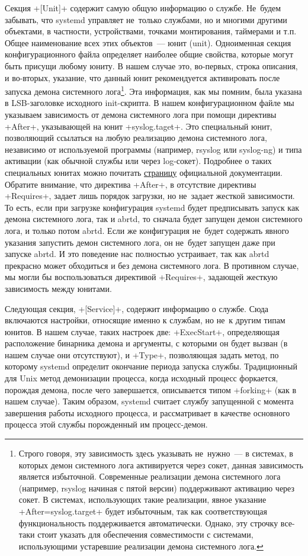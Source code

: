 \documentclass[10pt,oneside,a4paper]{article}
\begin{document}
Секция +[Unit]+ содержит самую общую информацию о службе. Не~будем
забывать, что systemd управляет не~только службами, но и многими другими
объектами, в частности, устройствами, точками монтирования, таймерами и т.п.
Общее наименование всех этих объектов~--- юнит (unit). Одноименная секция
конфигурационного файла определяет наиболее общие свойства, которые могут
быть присущи любому юниту. В нашем случае это, во-первых, строка описания, и
во-вторых, указание, что данный юнит рекомендуется активировать после запуска
демона системного лога\footnote{Строго говоря, эту зависимость здесь
указывать не~нужно~--- в системах, в которых демон системного лога активируется
через сокет, данная зависимость является избыточной. Современные реализации
демона системного лога (например, rsyslog начиная с пятой версии)
поддерживают активацию через сокет. В системах, использующих такие
реализации, явное указание +After=syslog.target+ будет избыточным, так
как соответствующая функциональность поддерживается автоматически. Однако,
эту строчку все-таки стоит указать для обеспечения совместимости с системами,
использующими устаревшие реализации демона системного лога.}. Эта информация,
как мы помним, была указана в LSB-заголовке исходного init-скрипта. В нашем
конфигурационном файле мы указываем зависимость от демона системного лога при
помощи директивы +After+, указывающей на юнит +syslog.taget+. Это
специальный юнит, позволяющий ссылаться на любую реализацию демона системного
лога, независимо от используемой программы (например, rsyslog или syslog-ng)
и типа активации (как обычной службы или через log-сокет). Подробнее о таких
специальных юнитах можно почитать
\href{http://www.freedesktop.org/software/systemd/man/systemd.special.html}%
{страницу} официальной документации. Обратите внимание, что директива +After+,
в отсутствие директивы +Requires+, задает лишь порядок загрузки, но
не~задает жесткой зависимости. То есть, если при загрузке конфигурация
systemd будет предписывать запуск как демона системного лога, так и abrtd, то
сначала будет запущен демон системного лога, и только потом abrtd. Если же
конфигурация не~будет содержать явного указания запустить демон системного
лога, он не~будет запущен даже при запуске abrtd. И это поведение нас
полностью устраивает, так как abrtd прекрасно может обходиться и без демона
системного лога. В противном случае, мы могли бы воспользоваться директивой
+Requires+, задающей жесткую зависимость между юнитами.

Следующая секция, +[Service]+, содержит информацию о службе. Сюда включаются
настройки, относящие именно к службам, но не~к другим типам юнитов. В нашем
случае, таких настроек две: +ExecStart+, определяющая расположение бинарника
демона и аргументы, с которыми он будет вызван (в нашем случае они
отсутствуют), и +Type+, позволяющая задать метод, по которому systemd определит
окончание периода запуска службы. Традиционный для Unix метод демонизации
процесса, когда исходный процесс форкается, порождая демона, после чего
завершается, описывается типом +forking+ (как в нашем случае). Таким образом,
systemd считает службу запущенной с момента завершения работы исходного
процесса, и рассматривает в качестве основного процесса этой службы
порожденный им процесс-демон.
\end{document}

